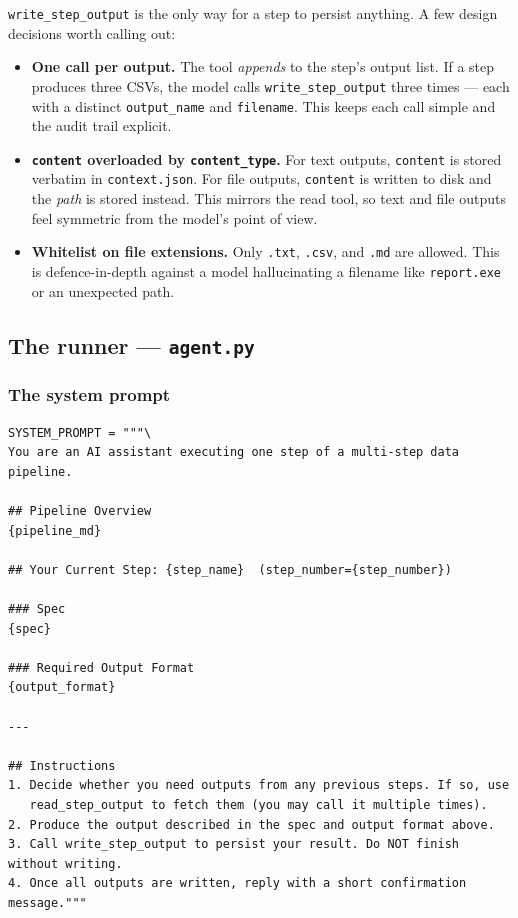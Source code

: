 \documentclass[12pt, a4paper]{article}
\begin{document}
\texttt{write\_step\_output} is the only way for a step to persist anything. A few design decisions worth calling out:

\begin{itemize}[leftmargin=1.5em]
  \item \textbf{One call per output.} The tool \textit{appends} to the step's output list. If a step produces three CSVs, the model calls \texttt{write\_step\_output} three times — each with a distinct \texttt{output\_name} and \texttt{filename}. This keeps each call simple and the audit trail explicit.
  \item \textbf{\texttt{content} overloaded by \texttt{content\_type}.} For text outputs, \texttt{content} is stored verbatim in \texttt{context.json}. For file outputs, \texttt{content} is written to disk and the \textit{path} is stored instead. This mirrors the read tool, so text and file outputs feel symmetric from the model's point of view.
  \item \textbf{Whitelist on file extensions.} Only \texttt{.txt}, \texttt{.csv}, and \texttt{.md} are allowed. This is defence-in-depth against a model hallucinating a filename like \texttt{report.exe} or an unexpected path.
\end{itemize}

\subsection{The runner — \texttt{agent.py}}

\subsubsection{The system prompt}

\begin{lstlisting}[style=pythonstyle]
SYSTEM_PROMPT = """\
You are an AI assistant executing one step of a multi-step data pipeline.

## Pipeline Overview
{pipeline_md}

## Your Current Step: {step_name}  (step_number={step_number})

### Spec
{spec}

### Required Output Format
{output_format}

---

## Instructions
1. Decide whether you need outputs from any previous steps. If so, use
   read_step_output to fetch them (you may call it multiple times).
2. Produce the output described in the spec and output format above.
3. Call write_step_output to persist your result. Do NOT finish without writing.
4. Once all outputs are written, reply with a short confirmation message."""
\end{lstlisting}
\end{document}
